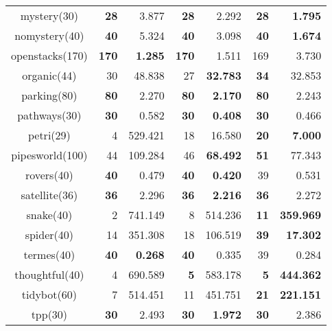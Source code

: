\begin{center}
\begin{tabular}{c rr rr rr}
    mystery(30)     & \textbf{28}   & 3.877             & \textbf{28}   & 2.292               & \textbf{28}     & \textbf{1.795} \\
    nomystery(40)   & \textbf{40}   & 5.324             & \textbf{40}   & 3.098               & \textbf{40}     & \textbf{1.674} \\
    openstacks(170) & \textbf{170}  & \textbf{1.285}    & \textbf{170}  & 1.511               & 169             & 3.730 \\
    organic(44)     & 30            & 48.838            & 27            & \textbf{32.783}     & \textbf{34}     & 32.853 \\
    parking(80)     & \textbf{80}   & 2.270             & \textbf{80}   & \textbf{2.170}      & \textbf{80}     & 2.243 \\
    pathways(30)    & \textbf{30}   & 0.582             & \textbf{30}   & \textbf{0.408}      & \textbf{30}     & 0.466 \\
    petri(29)       & 4             & 529.421           & 18            & 16.580              & \textbf{20}     & \textbf{7.000} \\
    pipesworld(100) & 44            & 109.284           & 46            & \textbf{68.492}     & \textbf{51}     & 77.343 \\
    rovers(40)      & \textbf{40}   & 0.479             & \textbf{40}   & \textbf{0.420}      & 39              & 0.531 \\
    satellite(36)   & \textbf{36}   & 2.296             & \textbf{36}   & \textbf{2.216}      & \textbf{36}     & 2.272 \\
    snake(40)       & 2             & 741.149           & 8             & 514.236             & \textbf{11}     & \textbf{359.969} \\
    spider(40)      & 14            & 351.308           & 18            & 106.519             & \textbf{39}     & \textbf{17.302} \\
    termes(40)      & \textbf{40}   & \textbf{0.268}    & \textbf{40}   & 0.335               & 39              & 0.284  \\
    thoughtful(40)  & 4             & 690.589           & \textbf{5}    & 583.178             & \textbf{5}      & \textbf{444.362} \\
    tidybot(60)     & 7             & 514.451           & 11            & 451.751             & \textbf{21}     & \textbf{221.151} \\
    tpp(30)         & \textbf{30}   & 2.493             & \textbf{30}   & \textbf{1.972}      & \textbf{30}     & 2.386 \\

\end{tabular}
\end{center}
